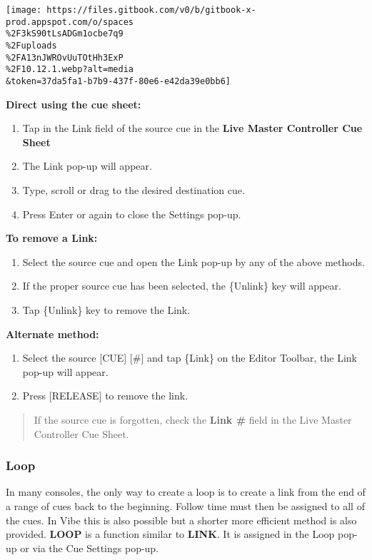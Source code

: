 \documentclass[
]{article}
\begin{document}
\texttt{[image: https://files.gitbook.com/v0/b/gitbook-x-prod.appspot.com/o/spaces\\\%2F3kS90tLsADGm1ocbe7q9\\\%2Fuploads\\\%2FA13nJWROvUuTOtHh3ExP\\\%2F10.12.1.webp?alt=media\\\&token=37da5fa1-b7b9-437f-80e6-e42da39e0bb6]}

\textbf{Direct using the cue sheet:}

\begin{enumerate}
\def\labelenumi{\arabic{enumi}.}
\item
  Tap in the Link field of the source cue in the \textbf{Live Master Controller Cue Sheet}
\item
  The Link pop-up will appear.
\item
  Type, scroll or drag to the desired destination cue.
\item
  Press Enter or again to close the Settings pop-up.
\end{enumerate}

\textbf{To remove a Link:}

\begin{enumerate}
\def\labelenumi{\arabic{enumi}.}
\item
  Select the source cue and open the Link pop-up by any of the above methods.
\item
  If the proper source cue has been selected, the \{Unlink\} key will appear.
\item
  Tap \{Unlink\} key to remove the Link.
\end{enumerate}

\textbf{Alternate method:}

\begin{enumerate}
\def\labelenumi{\arabic{enumi}.}
\item
  Select the source {[}CUE{]} {[}\#{]} and tap \{Link\} on the Editor Toolbar, the Link pop-up will appear.
\item
  Press {[}RELEASE{]} to remove the link.
\end{enumerate}

\begin{quote}
If the source cue is forgotten, check the \textbf{Link \#} field in the Live Master Controller Cue Sheet.
\end{quote}

\hypertarget{loop}{%
\subsubsection{Loop}\label{loop}}

In many consoles, the only way to create a loop is to create a link from the end of a range of cues back to the beginning. Follow time must then be assigned to all of the cues. In Vibe this is also possible but a shorter more efficient method is also provided. \textbf{LOOP} is a function similar to \textbf{LINK}. It is assigned in the Loop pop-up or via the Cue Settings pop-up.
\end{document}
